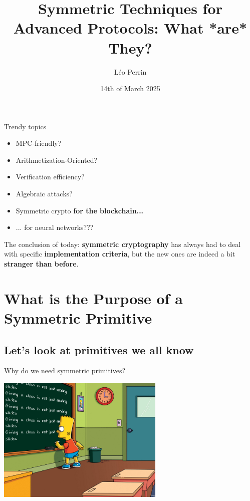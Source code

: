 \documentclass[presentation,aspectratio=1610]{beamer}
\title{Symmetric Techniques for Advanced Protocols: What *are* They?}
\author[Léo Perrin]{Léo Perrin\inst{1} }
\institute{Inria, Paris}
\date{14th of March 2025}
\begin{document}
{
  \pagestyle{empty}

  \maketitle


  \begin{frame}{Trendy topics}

    \begin{itemize}
      \large
    \item [] MPC-friendly? 
    \item [] Arithmetization-Oriented?
    \item [] Verification efficiency?
    \item [] Algebraic attacks? \pause
    \item [] Symmetric crypto \textbf{for the blockchain...} \pause
    \item [] \alert{... for neural networks???}
    \end{itemize}
    \begin{center}
      The conclusion of today: \textbf{symmetric cryptography} has always had to deal with specific \textbf{implementation criteria}, but the \alert{new ones} are indeed a bit \textbf{stranger than before}.
    \end{center}
  \end{frame}
}


\tocStartsAppearingHere{}


\section{What is the Purpose of a Symmetric Primitive}

\subsection{Let's look at primitives we all know}


\begin{frame}{Why do we need symmetric primitives?}
  \vfill

  \begin{center}
    \includegraphics[width=8cm]{./figures/simpsons}
  \end{center}
  
  \vfill
\end{frame}
\end{document}
